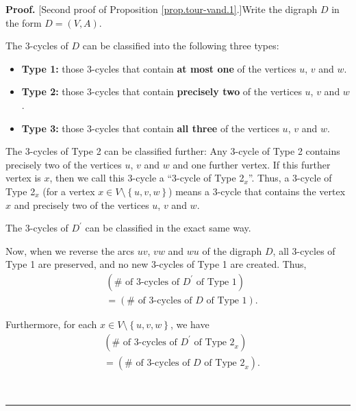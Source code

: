 \documentclass[numbers=enddot,12pt,final,onecolumn,notitlepage]{scrartcl}%
\numberwithin{exer}{subsection}
\theoremstyle{definition}
\newenvironment{proof}[1][Proof]{\noindent\textbf{#1.} }{\ \rule{0.5em}{0.5em}}
\begin{document}
\begin{proof}
[Second proof of Proposition \ref{prop.tour-vand.1}.]Write the digraph $D$ in
the form $D=\left(  V,A\right)  $.

The $3$-cycles of $D$ can be classified into the following three types:

\begin{itemize}
\item \textbf{Type 1:} those $3$-cycles that contain \textbf{at most one} of
the vertices $u$, $v$ and $w$.

\item \textbf{Type 2:} those $3$-cycles that contain \textbf{precisely two} of
the vertices $u$, $v$ and $w$.

\item \textbf{Type 3:} those $3$-cycles that contain \textbf{all three} of the
vertices $u$, $v$ and $w$.
\end{itemize}

The $3$-cycles of Type 2 can be classified further: Any $3$-cycle of Type 2
contains precisely two of the vertices $u$, $v$ and $w$ and one further
vertex. If this further vertex is $x$, then we call this $3$-cycle a
\textquotedblleft$3$-cycle of Type 2$_{x}$\textquotedblright. Thus, a
$3$-cycle of Type 2$_{x}$ (for a vertex $x\in V\setminus\left\{
u,v,w\right\}  $) means a $3$-cycle that contains the vertex $x$ and precisely
two of the vertices $u$, $v$ and $w$.

The $3$-cycles of $D^{\prime}$ can be classified in the exact same way.

Now, when we reverse the arcs $uv$, $vw$ and $wu$ of the digraph $D$, all
$3$-cycles of Type 1 are preserved, and no new $3$-cycles of Type 1 are
created. Thus,%
\begin{align}
&  \left(  \#\text{ of }3\text{-cycles of }D^{\prime}\text{ of Type 1}\right)
\nonumber\\
&  =\left(  \#\text{ of }3\text{-cycles of }D\text{ of Type 1}\right)  .
\label{pf.prop.tour-vand.1.2nd.type1}%
\end{align}


Furthermore, for each $x\in V\setminus\left\{  u,v,w\right\}  $, we have%
\begin{align}
&  \left(  \#\text{ of }3\text{-cycles of }D^{\prime}\text{ of Type 2}%
_{x}\right) \nonumber\\
&  =\left(  \#\text{ of }3\text{-cycles of }D\text{ of Type 2}_{x}\right)  .
\label{pf.prop.tour-vand.1.2nd.type2x}%
\end{align}



\end{proof}
\end{document}
